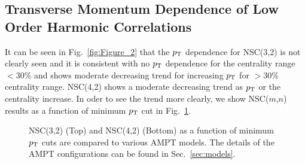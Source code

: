 \pagebreak

\subsection{Transverse Momentum Dependence of Low Order Harmonic Correlations}
\label{sec:ptdepsc}

It can be seen in Fig.~\ref{fig:Figure_2} that the $p_{\rm T}$ dependence for NSC(3,2) is not clearly seen and it is consistent with no $p_{\rm T}$ dependence for the centrality range $<$30\% and shows moderate decreasing trend for increasing $p_{\rm T}$ for $>$30\% centrality range.
NSC(4,2) shows a moderate decreasing trend as $p_{\rm T}$ or the centrality increase. 
In oder to see the trend more clearly, we show NSC($m$,$n$) results as a function of minimum $p_{\rm T}$ cut in Fig.~\ref{fig:Figure_8}.

\begin{figure}[p]
             \begin{center}
              \end{center}
             \caption{NSC(3,2) (Top) and NSC(4,2) (Bottom) as a function of minimum $p_{\rm T}$ cuts are compared to various AMPT models. The details of the AMPT configurations can be found in Sec.~\ref{sec:models}.}
             \label{fig:Figure_8}
\end{figure}

